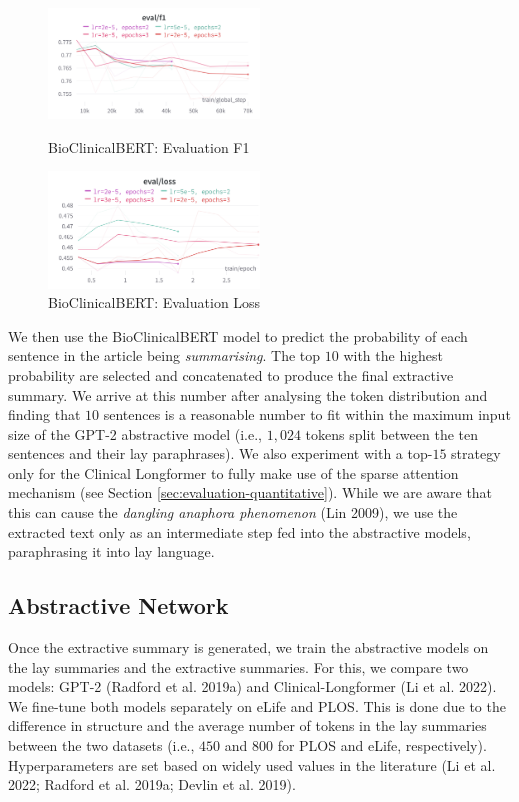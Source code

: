 \documentclass[
]{article}
\begin{document}
\begin{figure}
    \centering
    \includegraphics[width=0.5\textwidth]{charts/extractor-eval-f1.png}
    \caption{BioClinicalBERT: Evaluation F1}\label{fig:extractor-eval-f1}
    \vspace{0.25cm}
    \includegraphics[width=0.5\textwidth]{charts/extractor-eval-loss.png}
    \caption{BioClinicalBERT: Evaluation Loss}\label{fig:extractor-eval-loss}
\end{figure}

We then use the BioClinicalBERT model to predict the probability of each
sentence in the article being \emph{summarising}. The top \(10\) with
the highest probability are selected and concatenated to produce the
final extractive summary. We arrive at this number after analysing the
token distribution and finding that \(10\) sentences is a reasonable
number to fit within the maximum input size of the GPT-2 abstractive
model (i.e., \(1,024\) tokens split between the ten sentences and their
lay paraphrases). We also experiment with a top-\(15\) strategy only for
the Clinical Longformer to fully make use of the sparse attention
mechanism (see Section \ref{sec:evaluation-quantitative}). While we are
aware that this can cause the \emph{dangling anaphora phenomenon} (Lin
2009), we use the extracted text only as an intermediate step fed into
the abstractive models, paraphrasing it into lay language.

\hypertarget{sec:abstractive-network}{%
\subsection{Abstractive Network}\label{sec:abstractive-network}}

Once the extractive summary is generated, we train the abstractive
models on the lay summaries and the extractive summaries. For this, we
compare two models: GPT-2 (Radford et al. 2019a) and Clinical-Longformer
(Li et al. 2022). We fine-tune both models separately on eLife and PLOS.
This is done due to the difference in structure and the average number
of tokens in the lay summaries between the two datasets (i.e., \(450\)
and \(800\) for PLOS and eLife, respectively). Hyperparameters are set
based on widely used values in the literature (Li et al. 2022; Radford
et al. 2019a; Devlin et al. 2019).
\end{document}
